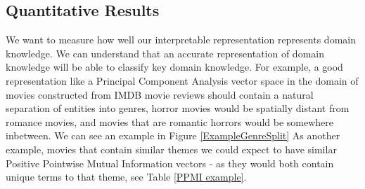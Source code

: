 

\subsection{Quantitative Results}

We want to measure how well our interpretable representation represents domain knowledge. We can understand that an accurate representation of domain knowledge will be able to classify key domain knowledge. For example, a good representation like a Principal Component Analysis vector space in the domain of movies constructed from IMDB movie reviews should contain a natural separation of entities into genres, horror movies would be spatially distant from romance movies, and movies that are romantic horrors would be somewhere inbetween. We can see an example in Figure \ref{ExampleGenreSplit} As another example, movies that contain similar themes we could expect to have similar Positive Pointwise Mutual Information vectors - as they would both contain unique terms to that theme, see Table \ref{PPMI example}.

